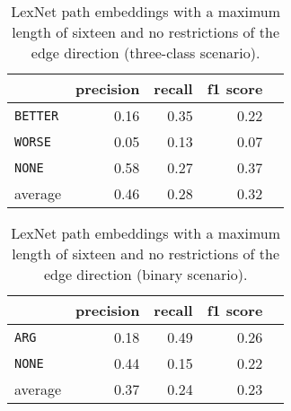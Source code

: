 \begin{table}[htbp] 
	\centering 
	\caption{LexNet path embeddings with a maximum length of sixteen and no restrictions of the edge direction (three-class scenario).} 
	\begin{tabular}{@{}lrrrr@{}}
		\toprule
		                & precision & recall & f1 score \\ \midrule 
		\texttt{BETTER} & 0.16      & 0.35   & 0.22     \\ 
		\texttt{WORSE}  & 0.05      & 0.13   & 0.07     \\ 
		\texttt{NONE}   & 0.58      & 0.27   & 0.37     \\ 
		average         & 0.46      & 0.28   & 0.32     \\ 			\bottomrule
	\end{tabular}
\end{table}

\begin{table}[htbp] 
	\centering 
	\caption{LexNet path embeddings with a maximum length of sixteen and no restrictions of the edge direction (binary scenario).} 
	\begin{tabular}{@{}lrrrr@{}}
		\toprule
		                & precision & recall & f1 score \\ \midrule 
		\texttt{ARG}    & 0.18      & 0.49   & 0.26     \\ 
		\texttt{NONE}   & 0.44      & 0.15   & 0.22     \\ 
		average         & 0.37      & 0.24   & 0.23     \\ 			\bottomrule
	\end{tabular}
\end{table}



